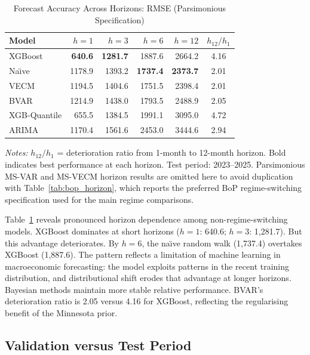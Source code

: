\documentclass[12pt,a4paper]{article}
\begin{document}
\begin{table}[htbp]
\centering
\caption{Forecast Accuracy Across Horizons: RMSE (Parsimonious Specification)}
\label{tab:horizon}
\begin{tabular}{lrrrrc}
\toprule
Model & $h = 1$ & $h = 3$ & $h = 6$ & $h = 12$ & $h_{12}/h_1$ \\
\midrule
XGBoost & \textbf{640.6} & \textbf{1281.7} & 1887.6 & 2664.2 & 4.16 \\
Na\"{\i}ve & 1178.9 & 1393.2 & \textbf{1737.4} & \textbf{2373.7} & 2.01 \\
VECM & 1194.5 & 1404.6 & 1751.5 & 2398.4 & 2.01 \\
BVAR & 1214.9 & 1438.0 & 1793.5 & 2488.9 & 2.05 \\
XGB-Quantile & 655.5 & 1384.5 & 1991.1 & 3095.0 & 4.72 \\
ARIMA & 1170.4 & 1561.6 & 2453.0 & 3444.6 & 2.94 \\
\bottomrule
\end{tabular}
\begin{tablenotes}
\small
\item \textit{Notes:} $h_{12}/h_1$ = deterioration ratio from 1-month to 12-month horizon. Bold indicates best performance at each horizon. Test period: 2023--2025. Parsimonious MS-VAR and MS-VECM horizon results are omitted here to avoid duplication with Table~\ref{tab:bop_horizon}, which reports the preferred BoP regime-switching specification used for the main regime comparisons.
\end{tablenotes}
\end{table}

Table~\ref{tab:horizon} reveals pronounced horizon dependence among non-regime-switching models. XGBoost dominates at short horizons ($h=1$: 640.6; $h=3$: 1,281.7). But this advantage deteriorates. By $h=6$, the na\"{\i}ve random walk (1,737.4) overtakes XGBoost (1,887.6). The pattern reflects a limitation of machine learning in macroeconomic forecasting: the model exploits patterns in the recent training distribution, and distributional shift erodes that advantage at longer horizons. Bayesian methods maintain more stable relative performance. BVAR's deterioration ratio is 2.05 versus 4.16 for XGBoost, reflecting the regularising benefit of the Minnesota prior.

\subsection{Validation versus Test Period}
\end{document}

